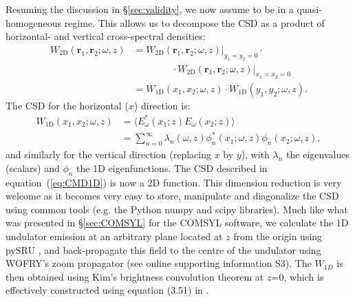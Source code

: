 \documentclass{iucr}
\begin{document}
Resuming the discussion in \S\ref{sec:validity}, we now assume to be in a quasi-homogeneous regime. This allows us to decompose the CSD as a product of horizontal- and vertical cross-spectral densities:
\begin{equation}\label{eq:CSD_2D_bis}
\begin{split}
W_\text{2D}(\textbf{r}_1,\textbf{r}_2;\omega,z) &= W_\text{2D}(\textbf{r}_1,\textbf{r}_2;\omega,z)\Big\rvert_{y_1=y_2=0} \cdot \\& \qquad\qquad\cdot W_\text{2D}(\textbf{r}_1,\textbf{r}_2;\omega,z)\Big\rvert_{x_1=x_2=0}\\
&= W_\text{1D}(x_1,x_2;\omega,z)\cdot W_\text{1D}(y_1,y_2;\omega,z).
\end{split}
\end{equation}
The CSD for the horizontal ($x$) direction is:
\begin{equation}\begin{split}
W_\text{1D}(x_1,x_2;\omega,z) &= \big\langle E^*_{\omega}(x_1;z) E_{\omega}(x_2;z)\big\rangle \\&=  \sum_{n=0}^{\infty} \lambda_n(\omega,z) \phi_n^*(x_1;\omega,z) \phi_n(x_2;\omega,z), 
\end{split}\label{eq:CMD1D}
\end{equation}
and similarly for the vertical direction (replacing $x$ by $y$), 
with $\lambda_n$ the eigenvalues (scalars) and $\phi_n$ the 1D eigenfunctions. The CSD described in equation~(\ref{eq:CMD1D}) is now a 2D function. This dimension reduction is very welcome as it becomes very easy to store, manipulate and diagonalize the CSD using common tools (e.g. the Python numpy and scipy libraries). Much like what was presented in \S\ref{sec:COMSYL} for the COMSYL software,  we calculate the 1D undulator emission at an arbitrary plane located at $z$ from the origin using pySRU \cite{pySRU}, and back-propagate this field to the centre of the undulator using WOFRY's zoom propagator (see online supporting information S3). The $W_{1D}$ is then obtained using Kim's brightness convolution theorem at $z$=0, which is effectively constructed using equation (3.51) in \cite{glassThesis}.
\end{document}
